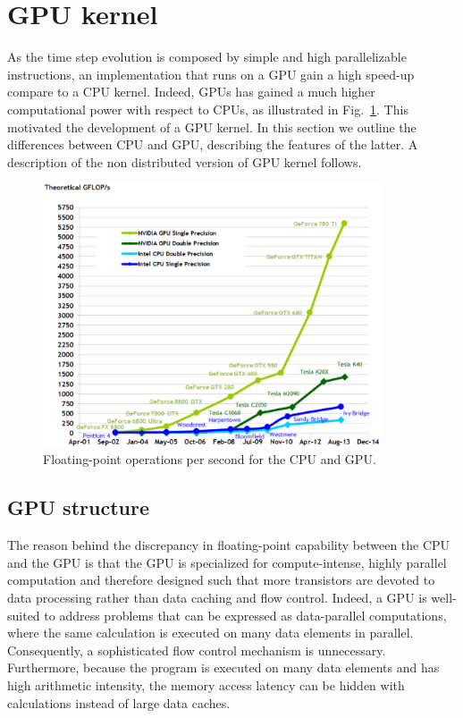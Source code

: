 \section{GPU kernel}
As the time step evolution is composed by simple and high parallelizable instructions, an implementation that runs on a GPU gain a high speed-up compare to a CPU kernel. Indeed, GPUs has gained a much higher computational power with respect to CPUs, as illustrated in Fig.~\ref{fig:CPU-GPU-computational-power}. This motivated the development of a GPU kernel. In this section we outline the differences between CPU and GPU, describing the features of the latter. A description of the non distributed version of GPU kernel follows.
\begin{figure}
   \centering
   \includegraphics[width=10cm]{Figs/CPU-GPU_computational_power.eps}
   \caption{Floating-point operations per second for the CPU and GPU.} \label{fig:CPU-GPU-computational-power}
\end{figure}

\subsection{GPU structure}
The reason behind the discrepancy in floating-point capability between the CPU and the GPU is that the GPU is specialized for compute-intense, highly parallel computation and therefore designed such that more transistors are devoted to data processing rather than data caching and flow control. Indeed, a GPU is well-suited to address problems that can be expressed as data-parallel computations, where the same calculation is executed on many data elements in parallel. Consequently,  a sophisticated flow control mechanism is unnecessary. Furthermore, because the program is executed on many data elements and has high arithmetic intensity, the memory access latency can be hidden with calculations instead of large data caches.


